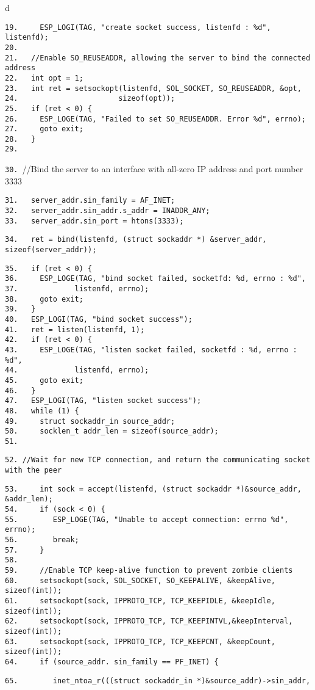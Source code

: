 \documentclass[a4paper,12pt]{book}
\begin{document}
\begin{codebloc}
\begin{tabular}{d}
\vspace{2pt}
\begin{verbatim}
19.     ESP_LOGI(TAG, "create socket success, listenfd : %d", listenfd);
20.	
21.   //Enable SO_REUSEADDR, allowing the server to bind the connected address
22.   int opt = 1;
23.   int ret = setsockopt(listenfd, SOL_SOCKET, SO_REUSEADDR, &opt,
24.                       sizeof(opt));
25.   if (ret < 0) {
26.     ESP_LOGE(TAG, "Failed to set SO_REUSEADDR. Error %d", errno);
27.     goto exit;
28.   }
29.	
\end{verbatim}
\verb|30. |\fontsize{9.5pt}{10pt}\selectfont//Bind the server to an interface with all-zero IP address and port number 3333
\footnotesize
\begin{verbatim}
31.   server_addr.sin_family = AF_INET;
32.   server_addr.sin_addr.s_addr = INADDR_ANY;
33.   server_addr.sin_port = htons(3333);
\end{verbatim}
\verb|34.   |\fontsize{9.5pt}{10pt}\selectfont\verb|ret = bind(listenfd, (struct sockaddr *) &server_addr, sizeof(server_addr));|
\footnotesize
\begin{verbatim}
35.   if (ret < 0) {
36.     ESP_LOGE(TAG, "bind socket failed, socketfd: %d, errno : %d",
37.             listenfd, errno);
38.     goto exit;
39.   }
40.   ESP_LOGI(TAG, "bind socket success");
41.   ret = listen(listenfd, 1);
42.   if (ret < 0) {
43.     ESP_LOGE(TAG, "listen socket failed, socketfd : %d, errno : %d",
44.             listenfd, errno);
45.     goto exit;
46.   }
47.   ESP_LOGI(TAG, "listen socket success");
48.   while (1) {
49.     struct sockaddr_in source_addr;
50.     socklen_t addr_len = sizeof(source_addr);
51.	
\end{verbatim}
\verb|52. |\fontsize{9.5pt}{10pt}\selectfont\verb|//Wait for new TCP connection, and return the communicating socket with the peer|
\footnotesize
\begin{verbatim}
53.     int sock = accept(listenfd, (struct sockaddr *)&source_addr, &addr_len);
54.     if (sock < 0) {
55.        ESP_LOGE(TAG, "Unable to accept connection: errno %d", errno);
56.        break;
57.     }
58.	
59.     //Enable TCP keep-alive function to prevent zombie clients
60.     setsockopt(sock, SOL_SOCKET, SO_KEEPALIVE, &keepAlive, sizeof(int));
61.     setsockopt(sock, IPPROTO_TCP, TCP_KEEPIDLE, &keepIdle, sizeof(int));
62.     setsockopt(sock, IPPROTO_TCP, TCP_KEEPINTVL,&keepInterval, sizeof(int));
63.     setsockopt(sock, IPPROTO_TCP, TCP_KEEPCNT, &keepCount, sizeof(int));
64.     if (source_addr. sin_family == PF_INET) {
\end{verbatim}
\verb|65.        inet_ntoa_r(((struct sockaddr_in *)&source_addr)->sin_addr,|
\end{tabular}
\end{codebloc}
\end{document}
